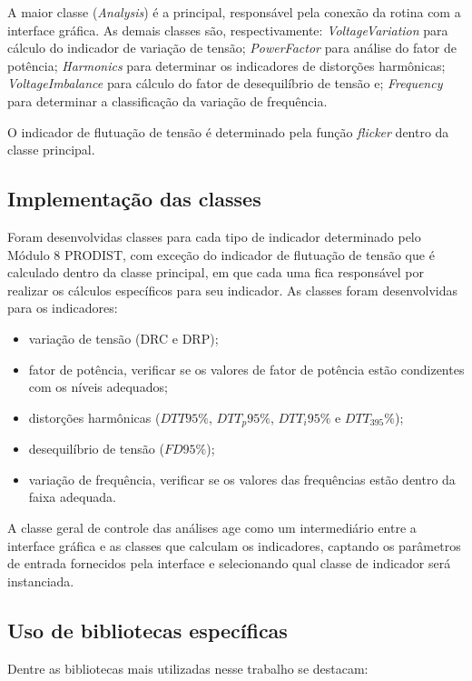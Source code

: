 A maior classe (\textit{Analysis}) é a principal, responsável pela conexão da rotina com a interface gráfica. As demais classes são, respectivamente: \textit{VoltageVariation} para cálculo do indicador de variação de tensão; \textit{PowerFactor} para análise do fator de potência; \textit{Harmonics} para determinar os indicadores de distorções harmônicas; \textit{VoltageImbalance} para cálculo do fator de desequilíbrio de tensão e; \textit{Frequency} para determinar a classificação da variação de frequência.

O indicador de flutuação de tensão é determinado pela função \textit{flicker} dentro da classe principal.

\subsection{Implementação das classes}

Foram desenvolvidas classes para cada tipo de indicador determinado pelo Módulo 8 PRODIST, com exceção do indicador de flutuação de tensão que é calculado dentro da classe principal, em que cada uma fica responsável por realizar os cálculos específicos para seu indicador. As classes foram desenvolvidas para os indicadores:

\begin{itemize}
  \item variação de tensão (DRC e DRP);
  \item fator de potência, verificar se os valores de fator de potência estão condizentes com os níveis adequados;
  \item distorções harmônicas ($DTT95\%$, $DTT_p95\%$, $DTT_i95\%$ e $DTT_395\%$);
  \item desequilíbrio de tensão ($FD95\%$);
  \item variação de frequência, verificar se os valores das frequências estão dentro da faixa adequada.
\end{itemize}

A classe geral de controle das análises age como um intermediário entre a interface gráfica e as classes que calculam os indicadores, captando os parâmetros de entrada fornecidos pela interface e selecionando qual classe de indicador será instanciada.

\subsection{Uso de bibliotecas específicas}

Dentre as bibliotecas mais utilizadas nesse trabalho se destacam:

